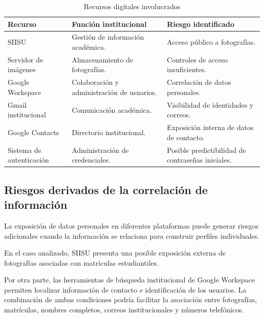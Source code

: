 \documentclass[12pt]{article}
\begin{document}
\begin{table}[H]
\centering
\caption{Recursos digitales involucrados}
\label{tab:recursos_digitales}
\small
\begin{tabularx}{\textwidth}{|X|X|X|}
\hline
\textbf{Recurso} &
\textbf{Función institucional} &
\textbf{Riesgo identificado} \\ \hline

SIISU &
Gestión de información académica. &
Acceso público a fotografías. \\ \hline

Servidor de imágenes &
Almacenamiento de fotografías. &
Controles de acceso insuficientes. \\ \hline

Google Workspace &
Colaboración y administración
de usuarios. &
Correlación de datos personales. \\ \hline

Gmail institucional &
Comunicación académica. &
Visibilidad de identidades
y correos. \\ \hline

Google Contacts &
Directorio institucional. &
Exposición interna de
datos de contacto. \\ \hline

Sistema de autenticación &
Administración de credenciales. &
Posible predictibilidad de
contraseñas iniciales. \\ \hline

\end{tabularx}
\end{table}

\subsection{Riesgos derivados de la
correlación de información}

La exposición de datos personales
en diferentes plataformas puede
generar riesgos adicionales cuando
la información se relaciona
para construir perfiles individuales.

En el caso analizado, SIISU
presenta una posible exposición
externa de fotografías asociadas
con matrículas estudiantiles.

Por otra parte, las herramientas
de búsqueda institucional de
Google Workspace permiten
localizar información de contacto
e identificación de los usuarios. La combinación de ambas condiciones
podría facilitar la asociación
entre fotografías, matrículas,
nombres completos, correos
institucionales y números telefónicos.
\end{document}
